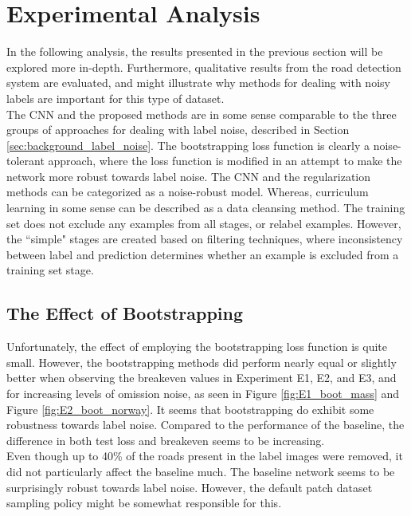 \section{Experimental Analysis}
\label{sec:Discussion}
In the following analysis, the results presented in the previous section will be explored more in-depth. Furthermore, qualitative results from the road detection system are evaluated, and might illustrate why methods for dealing with noisy labels are important for this type of dataset.\\

The \ac{CNN} and the proposed methods are in some sense comparable to the three groups of approaches for dealing with label noise, described in Section \ref{sec:background_label_noise}. The bootstrapping loss function is clearly a noise-tolerant approach, where the loss function is modified in an attempt to make the network more robust towards label noise. The \ac{CNN} and the regularization methods can be categorized as a noise-robust model. Whereas, curriculum learning in some sense can be described as a data cleansing method. The training set does not exclude any examples from all stages, or relabel examples.  However, the ``simple" stages are created based on filtering techniques, where inconsistency between label and prediction determines whether an example is excluded from a training set stage.  \\

\subsection{The Effect of Bootstrapping}
Unfortunately, the effect of employing the bootstrapping loss function is quite small. However, the bootstrapping methods did perform nearly equal or slightly better when observing the breakeven values in Experiment E1, E2, and E3, and for increasing levels of omission noise,  as seen in Figure \ref{fig:E1_boot_mass} and Figure \ref{fig:E2_boot_norway}. It seems that bootstrapping do exhibit some robustness towards label noise. Compared to the performance of the baseline, the difference in both test loss and breakeven seems to be increasing.  \\

Even though up to 40\% of the roads present in the label images were removed, it did not particularly affect the baseline much. The baseline network seems to be surprisingly robust towards label noise. However, the default patch dataset sampling policy might be somewhat responsible for this.\\

